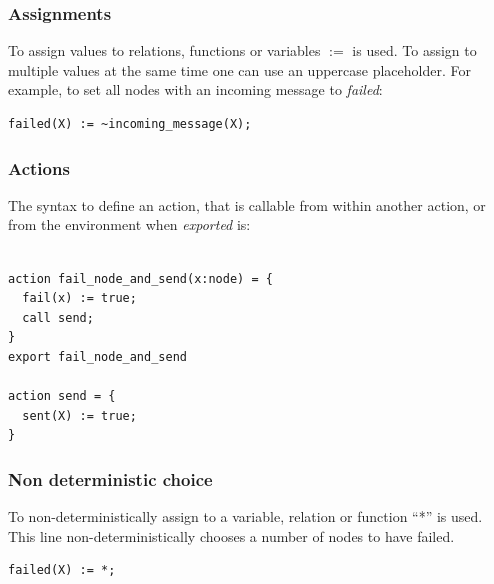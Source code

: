 \documentclass[fleqn]{article}
\begin{document}
\subsubsection{Assignments}


To assign values to relations, functions or variables $:=$ is used. To assign to multiple values
at the same time one can use an uppercase placeholder. For example, to set all nodes with an incoming message to \textit{failed}:

\begin{mdframed}[backgroundcolor=light-gray, roundcorner=10pt,leftmargin=1, rightmargin=1, innerleftmargin=15, innertopmargin=15,innerbottommargin=15, outerlinewidth=1, linecolor=light-gray]
\begin{lstlisting}
failed(X) := ~incoming_message(X);
\end{lstlisting}
\end{mdframed}


\subsubsection{Actions}
The syntax to define an action, that is callable from within another action, or from the environment when \textit{exported} is:

\begin{mdframed}[backgroundcolor=light-gray, roundcorner=10pt,leftmargin=1, rightmargin=1, innerleftmargin=15, innertopmargin=15,innerbottommargin=15, outerlinewidth=1, linecolor=light-gray]
\begin{lstlisting}

action fail_node_and_send(x:node) = {
  fail(x) := true;
  call send;
}
export fail_node_and_send

action send = {
  sent(X) := true;
}
\end{lstlisting}
\end{mdframed}

\subsubsection{Non deterministic choice}
To non-deterministically assign to a variable, relation or function ``*'' is used.
This line non-deterministically chooses a number of nodes to have failed.

\begin{mdframed}[backgroundcolor=light-gray, roundcorner=10pt,leftmargin=1, rightmargin=1, innerleftmargin=15, innertopmargin=15,innerbottommargin=15, outerlinewidth=1, linecolor=light-gray]
\begin{lstlisting}
failed(X) := *;
\end{lstlisting}
\end{mdframed}
\end{document}
